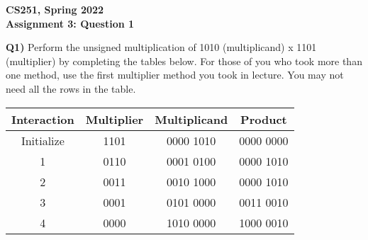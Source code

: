 \documentclass[12pt]{article}
\begin{document}
\begin{center}
{\Large\textbf{CS251, Spring 2022}}\\
\vspace{2mm}
{\Large\textbf{Assignment 3: Question 1}}\\
\vspace{3mm}
\end{center}
\textbf{Q1)} Perform the unsigned multiplication of 1010 (multiplicand) x 1101 (multiplier) by completing the tables below. For those of you who took more than one method, use the first multiplier method you took in lecture. You may not need all the rows in the table. \\

\begin{adjustwidth}{0em}{0pt}
\begin{center}
\begin{tabular}{|| c | c c c ||} 
 \hline
 Interaction & Multiplier & Multiplicand & Product \\ [0.5ex] 
 \hline
 Initialize & 1101 & 0000 1010 & 0000 0000 \\ 
 \hline\hline
 1 & 0110 & 0001 0100 & 0000 1010  \\ 
 \hline
 2 & 0011 & 0010 1000 & 0000 1010 \\ 
 \hline
 3 & 0001 & 0101 0000 & 0011 0010 \\ 
 \hline
 4 & 0000 & 1010 0000 & 1000 0010 \\ 
 \hline
\end{tabular}
\end{center}
\end{adjustwidth}
\end{document}
